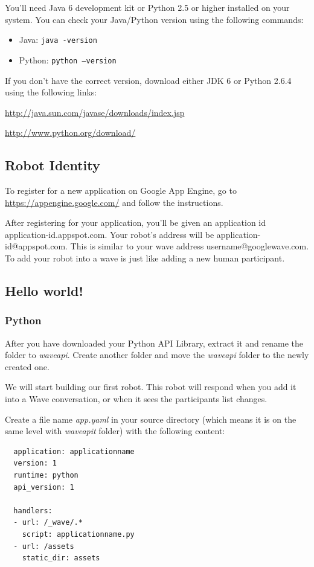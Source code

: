 You'll need Java 6 development kit or Python 2.5 or higher installed
on your system. You can check your Java/Python version using the
following commands:

\begin{itemize}
\item Java:  {\tt java -version}
\item Python:  {\tt python --version}
\end{itemize}

If you don't have the correct version, download either JDK 6 or Python
2.6.4 using the following links:

\url{http://java.sun.com/javase/downloads/index.jsp}

\url{http://www.python.org/download/}

\subsection{Robot Identity}

To register for a new application on Google App Engine, go
to \url{https://appengine.google.com/} and follow the instructions.

After registering for your application, you'll be given an application
id application-id.appspot.com. Your robot's address will be
application-id@appspot.com.  This is similar to your wave address
username@googlewave.com. To add your robot into a wave is just like
adding a new human participant.

\subsection{Hello world!}
\subsubsection{Python}

After you have downloaded your Python API Library, extract it and
rename the folder to {\em waveapi}. Create another folder and move the
{\em waveapi} folder to the newly created one.

We will start building our first robot. This robot will respond when
you add it into a Wave conversation, or when it sees the participants
list changes.

Create a file name {\em app.yaml} in your source directory (which
means it is on the same level with {\em waveapit} folder) with the
following content:

\begin{verbatim}
  application: applicationname
  version: 1
  runtime: python
  api_version: 1

  handlers:
  - url: /_wave/.*
    script: applicationname.py
  - url: /assets
    static_dir: assets
\end{verbatim}


